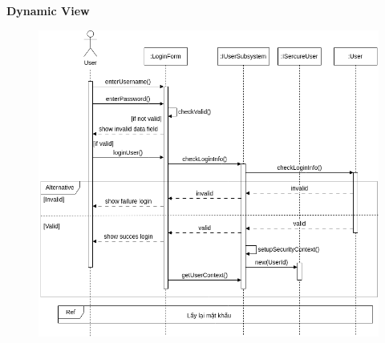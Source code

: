 \textbf{Dynamic View}
\begin{figure}[H]
    \centering
    \includegraphics[width=1.1\linewidth]{img3.1.2/design mechanism-seq secure.drawio.png}
\end{figure}

